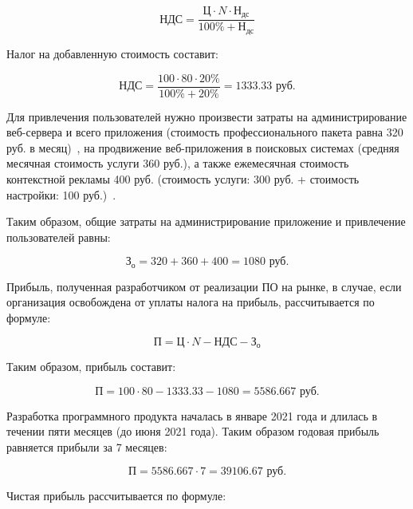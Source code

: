 \begin{equation}
    \textit{НДС} = \frac{\textit{Ц} \cdot \textit{N} \cdot \textit{Н}_\textit{дс}}{100\% + \textit{Н}_\textit{дс}}
\end{equation}

Налог на добавленную стоимость составит:

\begin{equation*}
    \textit{НДС} = \frac{100 \cdot 80 \cdot 20\%}{100\% + 20\%} = 1333.33 \textrm{ руб.}
\end{equation*}

Для привлечения пользователей нужно произвести затраты на администрирование веб-сервера и всего приложения (стоимость профессионального пакета равна 320 руб. в месяц)~\cite{admin_web_server}, на продвижение веб-приложения в поисковых системах (средняя месячная стоимость услуги 360 руб.), а также ежемесячная стоимость контекстной рекламы 400 руб. (стоимость услуги: 300 руб. + стоимость настройки: 100 руб.)~\cite{contex_advertisment}.

Таким образом, общие затраты на администрирование приложение и привлечение пользователей равны:

\begin{equation*}
    \textit{З}_\textit{о} = 320 + 360 + 400 = 1080 \textrm{ руб.}
\end{equation*}

Прибыль, полученная разработчиком от реализации ПО на рынке, в случае, если организация освобождена от уплаты налога на прибыль, рассчитывается по формуле:

\begin{equation}
    \textit{П} = \textit{Ц} \cdot \textit{N} - \textit{НДС} -\textit{З}_\textit{о}
\end{equation}

Таким образом, прибыль составит:

\begin{equation*}
    \textit{П} = 100 \cdot 80 - 1333.33 - 1080 = 5586.667 \textrm{ руб.}
\end{equation*}

Разработка программного продукта началась в январе 2021 года и длилась в течении пяти месяцев (до июня 2021 года). Таким образом годовая прибыль равняется прибыли за 7 месяцев:

\begin{equation*}
    \textit{П} = 5586.667 \cdot 7 = 39106.67  \textrm{ руб.}
\end{equation*}

Чистая прибыль рассчитывается по формуле:

